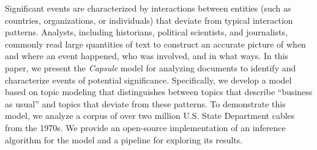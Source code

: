 
Significant events are characterized by interactions between entities
(such as countries, organizations, or individuals) that deviate from
typical interaction patterns. Analysts, including historians,
political scientists, and journalists, commonly read large quantities
of text to construct an accurate picture of when and where an event
happened, who was involved, and in what ways. In this paper, we
present the \textit{Capsule} model for analyzing documents to identify
and characterize events of potential significance. Specifically, we
develop a model based on topic modeling that distinguishes between
topics that describe ``business as usual'' and topics that deviate
from these patterns. To demonstrate this model, we analyze a corpus of
over two million U.S. State Department cables from the 1970s. We
provide an open-source implementation of an inference algorithm for
the model and a pipeline for exploring its results.
